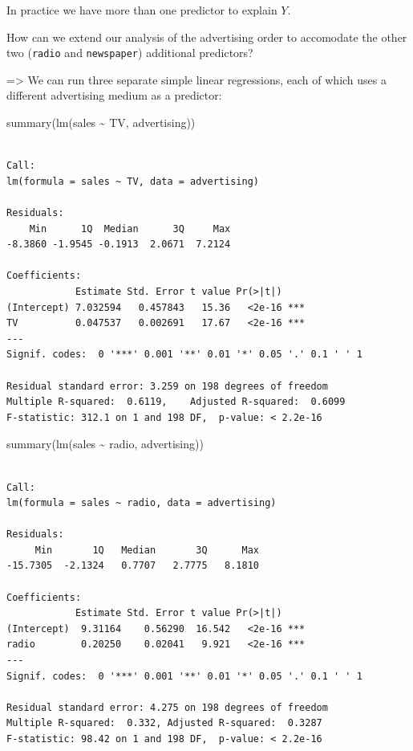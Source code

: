 \documentclass[
  letterpaper,
  DIV=11,
  numbers=noendperiod]{scrreprt}
\newenvironment{Shaded}{\begin{snugshade}}{\end{snugshade}}
\newcommand{\FunctionTok}[1]{\textcolor[rgb]{0.02,0.16,0.49}{#1}}
\newcommand{\NormalTok}[1]{\textcolor[rgb]{0.33,0.33,0.33}{#1}}
\newcommand{\SpecialCharTok}[1]{\textcolor[rgb]{0.00,0.46,0.62}{#1}}
\begin{document}
In practice we have more than one predictor to explain \(Y\).

How can we extend our analysis of the advertising order to accomodate
the other two (\texttt{radio} and \texttt{newspaper}) additional
predictors?

=\textgreater{} We can run three separate simple linear regressions,
each of which uses a different advertising medium as a predictor:

\begin{Shaded}
\begin{Highlighting}[]
\FunctionTok{summary}\NormalTok{(}\FunctionTok{lm}\NormalTok{(sales }\SpecialCharTok{\textasciitilde{}}\NormalTok{ TV, advertising))}
\end{Highlighting}
\end{Shaded}

\begin{verbatim}

Call:
lm(formula = sales ~ TV, data = advertising)

Residuals:
    Min      1Q  Median      3Q     Max 
-8.3860 -1.9545 -0.1913  2.0671  7.2124 

Coefficients:
            Estimate Std. Error t value Pr(>|t|)    
(Intercept) 7.032594   0.457843   15.36   <2e-16 ***
TV          0.047537   0.002691   17.67   <2e-16 ***
---
Signif. codes:  0 '***' 0.001 '**' 0.01 '*' 0.05 '.' 0.1 ' ' 1

Residual standard error: 3.259 on 198 degrees of freedom
Multiple R-squared:  0.6119,    Adjusted R-squared:  0.6099 
F-statistic: 312.1 on 1 and 198 DF,  p-value: < 2.2e-16
\end{verbatim}

\begin{Shaded}
\begin{Highlighting}[]
\FunctionTok{summary}\NormalTok{(}\FunctionTok{lm}\NormalTok{(sales }\SpecialCharTok{\textasciitilde{}}\NormalTok{ radio, advertising))}
\end{Highlighting}
\end{Shaded}

\begin{verbatim}

Call:
lm(formula = sales ~ radio, data = advertising)

Residuals:
     Min       1Q   Median       3Q      Max 
-15.7305  -2.1324   0.7707   2.7775   8.1810 

Coefficients:
            Estimate Std. Error t value Pr(>|t|)    
(Intercept)  9.31164    0.56290  16.542   <2e-16 ***
radio        0.20250    0.02041   9.921   <2e-16 ***
---
Signif. codes:  0 '***' 0.001 '**' 0.01 '*' 0.05 '.' 0.1 ' ' 1

Residual standard error: 4.275 on 198 degrees of freedom
Multiple R-squared:  0.332, Adjusted R-squared:  0.3287 
F-statistic: 98.42 on 1 and 198 DF,  p-value: < 2.2e-16
\end{verbatim}
\end{document}
